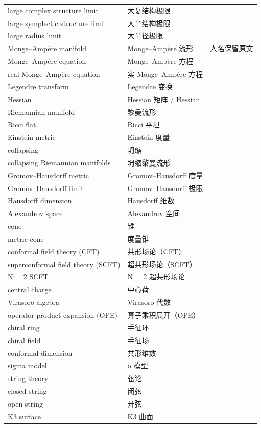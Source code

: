 \begin{longtable}{@{}p{}p{}p{}@{}}
large complex structure limit & 大复结构极限 &  \\
large symplectic structure limit & 大辛结构极限 &  \\
large radius limit & 大半径极限 &  \\
Monge–Ampère manifold & Monge–Ampère 流形 & 人名保留原文 \\
Monge–Ampère equation & Monge–Ampère 方程 &  \\
real Monge–Ampère equation & 实 Monge–Ampère 方程 &  \\
Legendre transform & Legendre 变换 &  \\
Hessian & Hessian 矩阵 / Hessian &  \\
Riemannian manifold & 黎曼流形 &  \\
Ricci flat & Ricci 平坦 &  \\
Einstein metric & Einstein 度量 &  \\
collapsing & 坍缩 &  \\
collapsing Riemannian manifolds & 坍缩黎曼流形 &  \\
Gromov–Hausdorff metric & Gromov–Hausdorff 度量 &  \\
Gromov–Hausdorff limit & Gromov–Hausdorff 极限 &  \\
Hausdorff dimension & Hausdorff 维数 &  \\
Alexandrov space & Alexandrov 空间 &  \\
cone & 锥 &  \\
metric cone & 度量锥 &  \\
conformal field theory (CFT) & 共形场论（CFT） &  \\
superconformal field theory (SCFT) & 超共形场论（SCFT） &  \\
N = 2 SCFT & N = 2 超共形场论 &  \\
central charge & 中心荷 &  \\
Virasoro algebra & Virasoro 代数 &  \\
operator product expansion (OPE) & 算子乘积展开（OPE） &  \\
chiral ring & 手征环 &  \\
chiral field & 手征场 &  \\
conformal dimension & 共形维数 &  \\
sigma model & σ 模型 &  \\
string theory & 弦论 &  \\
closed string & 闭弦 &  \\
open string & 开弦 &  \\
K3 surface & K3 曲面 &  \\

\end{longtable}
